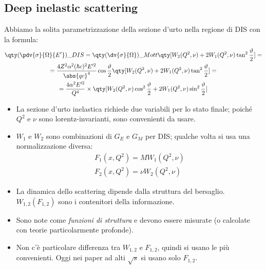 \subsection{Deep inelastic scattering}
Abbiamo la solita parametrizzazione della sezione d'urto nella regione di DIS con la formula:
\begin{gather*}
\qty(\pdv{\sigma}{\Omega}{E'})\_{DIS}=\qty(\dv{\sigma}{\Omega})\_{Mott}\qty[W_2(Q^2,\nu)+2W_1(Q^2,\nu)\tan^2\frac\vartheta2]=\\
=\frac{4Z^2\alpha^2(\hbar c)^2E'^2}{\abs{qc}^4}\cos\frac\vartheta2\qty[W_2(Q^2,\nu)+2W_1(Q^2,\nu)\tan^2\frac\vartheta2]=\\
=\frac{4\alpha^2E'^2}{Q^4}\times\qty[W_2(Q^2,\nu)\cos^2\frac\vartheta2+2W_1(Q^2,\nu)\sin^2\frac\vartheta2]
\end{gather*}
\begin{itemize}
    \item La sezione d'urto inelastica richiede due variabili per lo stato finale; poiché $Q^2$ e $\nu$ sono lorentz-invarianti, sono convenienti da usare.
    \item $W_1$ e $W_2$ sono combinazioni di $G_E$ e $G_M$ per DIS; qualche volta si usa una normalizzazione diversa:
    \begin{gather*}
    F_1(x,Q^2)=MW_1(Q^2,\nu)\\
    F_2(x,Q^2)=\nu W_2(Q^2,\nu)
    \end{gather*}
    \item La dinamica dello scattering dipende dalla struttura del bersaglio. $W_{1,2}(F_{1,2})$ sono i contenitori della informazione. 
    \item Sono note come \textit{funzioni di struttura} e devono essere misurate (o calcolate con teorie particolarmente profonde).
    \item Non c'è particolare differenza tra $W_{1,2}$ e $F_{1,2}$, quindi si usano le più convenienti. Oggi nei paper ad alti $\sqrt s$ si usano solo $F_{1,2}$.
\end{itemize}
